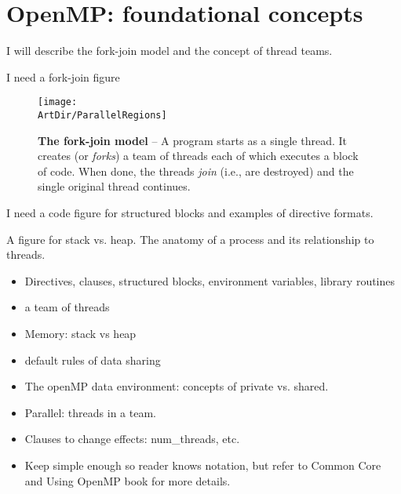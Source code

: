 \section{OpenMP: foundational concepts}
\label{sec:OMPconcepts}

I will describe the fork-join model and the concept of thread teams.  

I need a fork-join figure

\begin{figure}[!htbp]
\texttt{[image: \\ArtDir/ParallelRegions]}
\centering
\caption
{\textbf{The fork-join model} -- \small 
A program starts as a single thread. It creates (or \emph{forks})
a team of threads each of which executes a block of code.  When done, the threads
\emph{join} (i.e., are destroyed) and the single original thread continues. 
}
\label{fig:regions}
\end{figure}





I need a code figure for structured blocks and examples of directive formats.

A figure for stack vs. heap.    The anatomy of a process and its relationship to threads.


\begin{itemize}
\item Directives, clauses, structured blocks, environment variables, library routines
\item a team of threads
\item Memory: stack vs heap
\item default rules of data sharing
\item The openMP data environment: concepts of private vs. shared. 
\end{itemize}




\begin{itemize}
  \item Parallel: threads in a team.
  \item Clauses to change effects: num\_threads, etc.
  \item Keep simple enough so reader knows notation, but refer to Common Core and Using OpenMP book for more details.
\end{itemize}



